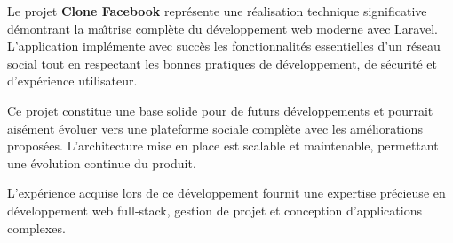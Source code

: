 \documentclass[12pt,a4paper]{article}
\begin{document}
Le projet \textbf{Clone Facebook} repr\'esente une r\'ealisation technique significative d\'emontrant la ma\^{\i}trise compl\`ete du d\'eveloppement web moderne avec Laravel. L'application impl\'emente avec succ\`es les fonctionnalit\'es essentielles d'un r\'eseau social tout en respectant les bonnes pratiques de d\'eveloppement, de s\'ecurit\'e et d'exp\'erience utilisateur.

Ce projet constitue une base solide pour de futurs d\'eveloppements et pourrait ais\'ement \'evoluer vers une plateforme sociale compl\`ete avec les am\'eliorations propos\'ees. L'architecture mise en place est scalable et maintenable, permettant une \'evolution continue du produit.

L'exp\'erience acquise lors de ce d\'eveloppement fournit une expertise pr\'ecieuse en d\'eveloppement web full-stack, gestion de projet et conception d'applications complexes.
\end{document}
